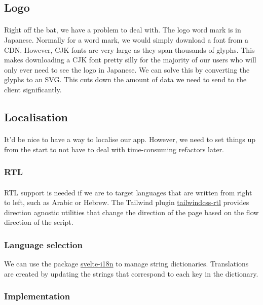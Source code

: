 \documentclass{report}
\begin{document}
\subsection{Logo}
\paragraph{}
Right off the bat, we have a problem to deal with. The logo word mark is in Japanese. Normally for a word mark, we would simply download a font from a CDN. However, CJK fonts are very large as they span thousands of glyphs. This makes downloading a CJK font pretty silly for the majority of our users who will only ever need to see the logo in Japanese. We can solve this by converting the glyphs to an SVG. This cuts down the amount of data we need to send to the client significantly.

\subsection{Localisation}
\paragraph{}
It'd be nice to have a way to localise our app. However, we need to set things up from the start to not have to deal with time-consuming refactors later.

\subsubsection{RTL}
\paragraph{}
RTL support is needed if we are to target languages that are written from right to left, such as Arabic or Hebrew. The Tailwind plugin \href{https://github.com/20lives/tailwindcss-rtl}{tailwindcss-rtl} provides direction agnostic utilities that change the direction of the page based on the flow direction of the script.

\subsubsection{Language selection}
We can use the package \href{https://github.com/kaisermann/svelte-i18n}{svelte-i18n} to manage string dictionaries. Translations are created by updating the strings that correspond to each key in the dictionary.

\subsubsection{Implementation}
\end{document}
